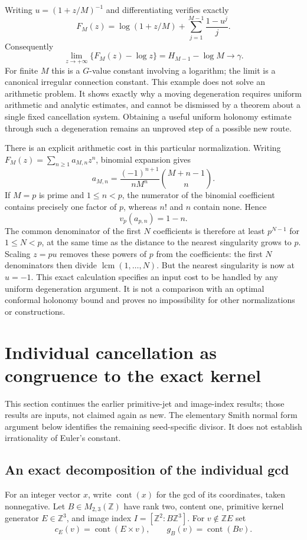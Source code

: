 \documentclass[11pt,a4paper]{article}
\theoremstyle{definition}
\theoremstyle{remark}
\numberwithin{equation}{section}
\begin{document}
Writing $u=(1+z/M)^{-1}$ and differentiating verifies exactly
\[
 F_M(z)=\log(1+z/M)+\sum_{j=1}^{M-1}\frac{1-u^j}{j}.
\]
Consequently
\[
 \lim_{z\to+\infty}\{F_M(z)-\log z\}
       =H_{M-1}-\log M\longrightarrow\gamma.
\]
For finite $M$ this is a $G$-value constant involving a logarithm;
the limit is a canonical irregular connection constant.
This example does not solve an arithmetic problem.  It shows
exactly why a moving degeneration requires uniform arithmetic
and analytic estimates, and cannot be dismissed by a theorem
about a single fixed cancellation system.  Obtaining a useful
uniform holonomy estimate through such a degeneration remains
an unproved step of a possible new route.

There is an explicit arithmetic cost in this particular normalization.
Writing $F_M(z)=\sum_{n\geq1}a_{M,n}z^n$, binomial expansion gives
\[
 a_{M,n}=\frac{(-1)^{n+1}}{nM^n}\binom{M+n-1}{n}.
\]
If $M=p$ is prime and $1\leq n<p$, the numerator of the binomial
coefficient contains precisely one factor of $p$, whereas $n!$
and $n$ contain none.  Hence
\[
 v_p(a_{p,n})=1-n.
\]
The common denominator of the first $N$ coefficients is therefore
at least $p^{N-1}$ for $1\leq N<p$, at the same time as the
distance to the nearest singularity grows to $p$.
Scaling $z=pu$ removes these powers of $p$ from the coefficients:
the first $N$ denominators then divide $\operatorname{lcm}(1,\ldots,N)$.
But the nearest singularity is now at $u=-1$.
This exact calculation specifies an input cost to be handled by
any uniform degeneration argument.  It is not a comparison with
an optimal conformal holonomy bound and proves no impossibility
for other normalizations or constructions.


\section{Individual cancellation as congruence to the exact kernel}
\label{p6:sec:seed-content}
This section continues the earlier primitive-jet and image-index results;
those results are inputs, not claimed again as new. The elementary Smith
normal form argument below identifies the remaining seed-specific divisor.
It does not establish irrationality of Euler's constant.

\subsection{An exact decomposition of the individual gcd}
For an integer vector $x$, write $\operatorname{cont}(x)$ for the gcd of its
coordinates, taken nonnegative. Let $B\in M_{2,3}(\mathbb Z)$ have rank two,
content one, primitive kernel generator $E\in\mathbb Z^3$, and image index
$I=[\mathbb Z^2:B\mathbb Z^3]$. For $v\notin\mathbb ZE$ set
\[
 c_E(v)=\operatorname{cont}(E\times v),\qquad
 g_B(v)=\operatorname{cont}(Bv).
\]
\end{document}
